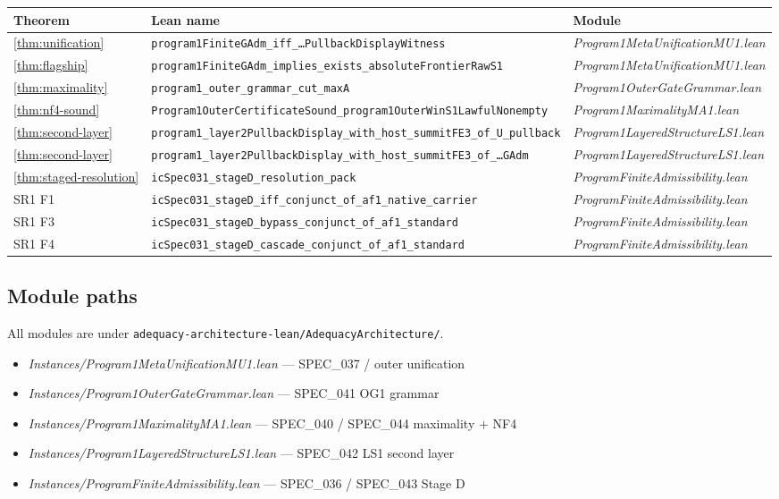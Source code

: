 \documentclass[11pt]{article}
\theoremstyle{plain}
\theoremstyle{definition}
\newcommand{\lean}[1]{\texttt{\small #1}}
\newcommand{\leanmod}[1]{\textit{\small #1}}
\begin{document}
\begin{center}
\small
\begin{tabular}{lll}
\hline
Theorem & Lean name & Module \\
\hline
\ref{thm:unification} &
  \lean{program1FiniteGAdm\_iff\_\ldots{}PullbackDisplayWitness} &
  \leanmod{Program1MetaUnificationMU1.lean} \\
\ref{thm:flagship} &
  \lean{program1FiniteGAdm\_implies\_exists\_absoluteFrontierRawS1} &
  \leanmod{Program1MetaUnificationMU1.lean} \\
\ref{thm:maximality} &
  \lean{program1\_outer\_grammar\_cut\_maxA} &
  \leanmod{Program1OuterGateGrammar.lean} \\
\ref{thm:nf4-sound} &
  \lean{Program1OuterCertificateSound\_program1OuterWinS1LawfulNonempty} &
  \leanmod{Program1MaximalityMA1.lean} \\
\ref{thm:second-layer} &
  \lean{program1\_layer2PullbackDisplay\_with\_host\_summitFE3\_of\_U\_pullback} &
  \leanmod{Program1LayeredStructureLS1.lean} \\
\ref{thm:second-layer} &
  \lean{program1\_layer2PullbackDisplay\_with\_host\_summitFE3\_of\_\ldots{}GAdm} &
  \leanmod{Program1LayeredStructureLS1.lean} \\
\ref{thm:staged-resolution} &
  \lean{icSpec031\_stageD\_resolution\_pack} &
  \leanmod{ProgramFiniteAdmissibility.lean} \\
SR1 F1 &
  \lean{icSpec031\_stageD\_iff\_conjunct\_of\_af1\_native\_carrier} &
  \leanmod{ProgramFiniteAdmissibility.lean} \\
SR1 F3 &
  \lean{icSpec031\_stageD\_bypass\_conjunct\_of\_af1\_standard} &
  \leanmod{ProgramFiniteAdmissibility.lean} \\
SR1 F4 &
  \lean{icSpec031\_stageD\_cascade\_conjunct\_of\_af1\_standard} &
  \leanmod{ProgramFiniteAdmissibility.lean} \\
\hline
\end{tabular}
\end{center}

\subsection*{Module paths}

All modules are under \lean{adequacy-architecture-lean/AdequacyArchitecture/}.

\begin{itemize}
  \item \leanmod{Instances/Program1MetaUnificationMU1.lean} --- SPEC\_037 / outer unification
  \item \leanmod{Instances/Program1OuterGateGrammar.lean} --- SPEC\_041 OG1 grammar
  \item \leanmod{Instances/Program1MaximalityMA1.lean} --- SPEC\_040 / SPEC\_044 maximality + NF4
  \item \leanmod{Instances/Program1LayeredStructureLS1.lean} --- SPEC\_042 LS1 second layer
  \item \leanmod{Instances/ProgramFiniteAdmissibility.lean} --- SPEC\_036 / SPEC\_043 Stage D
\end{itemize}
\end{document}
